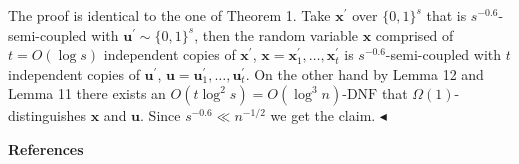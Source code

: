 \documentclass[10pt,a4paper]{article}
\begin{document}
The proof is identical to the one of Theorem 1. Take $\bm{x}^{\prime}$ over $\{0,1\}^{s}$ that is $s^{-0.6}$-semi-coupled with $\bm{u}^{\prime}\sim\{0,1\}^{s}$, then the random variable $\bm{x}$ comprised of $t=O(\log s)$ independent copies of $\bm{x}^{\prime}$, $\bm{x}=\bm{x}^{\prime}_{1},\dots,\bm{x}^{\prime}_{t}$ is $s^{-0.6}$-semi-coupled with $t$ independent copies of $\bm{u}^{\prime}$, $\bm{u}=\bm{u}^{\prime}_{1},\dots,\bm{u}^{\prime}_{t}$. On the other hand by Lemma 12 and Lemma 11 there exists an $O(t\log^{2}s)=O(\log^{3}n)$-$\mathrm{DNF}$ that $\Omega(1)$-distinguishes $\bm{x}$ and $\bm{u}$. Since $s^{-0.6}\ll n^{-1/2}$ we get the claim.
$\blacktriangleleft$\par







\par\medskip\noindent\textbf{References}\par
\end{document}
